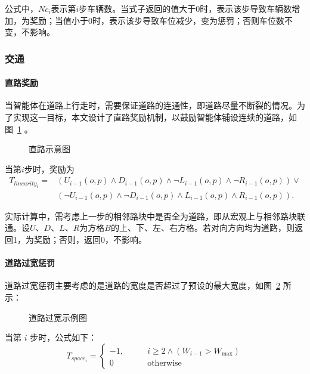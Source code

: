 公式中，$Nc_i$表示第$i$步车辆数。当式子返回的值大于0时，表示该步导致车辆数增加，为奖励；当值小于0时，表示该步导致车位减少，变为惩罚；否则车位数不变，不影响。
\subsubsection{交通}
\paragraph{直路奖励}
当智能体在道路上行走时，需要保证道路的连通性，即道路尽量不断裂的情况。为了实现这一目标，本文设计了直路奖励机制，以鼓励智能体铺设连续的道路，如图~\ref{fig:stri_road} 。
\begin{figure}[!htb]
    \centering
    
    \caption{\label{fig:stri_road}直路示意图}
\end{figure}

当第$i$步时，奖励为
\begin{equation}
    \begin{aligned}
    T_{linearity_i} = & (U_{i-1}(o,p) \land D_{i-1}(o,p) \land \neg L_{i-1}(o,p) \land \neg R_{i-1}(o,p)) \lor \\ 
    & (\neg U_{i-1}(o,p) \land \neg D_{i-1}(o,p) \land  L_{i-1}(o,p) \land  R_{i-1}(o,p)).
    \end{aligned}
\end{equation}

实际计算中，需考虑上一步的相邻路块中是否全为道路，即从宏观上与相邻路块联通。设$U$、$D$、$L$、$R$为方格$B$的上、下、左、右方格。若对向方向均为道路，则返回1，为奖励；否则，返回0，不影响。
\paragraph{道路过宽惩罚}
道路过宽惩罚主要考虑的是道路的宽度是否超过了预设的最大宽度，如图~\ref{fig:excessive_road} 所示：
\begin{figure}[!htb]
    \centering
    
    \caption{道路过宽示例图}
    \label{fig:excessive_road}
\end{figure}

当第 $i$ 步时，公式如下：
\begin{equation}
    T_{space_i} = \left\{
    \begin{array}{ll}
        -1,\quad & \quad i\geq 2 \land ( W_{i-1} > W_{\max}) \\
        0\quad   & \quad \text{otherwise}
    \end{array}
    \right.
\end{equation}

